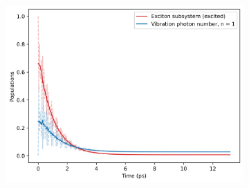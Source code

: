 \documentclass[11pt]{article}
\begin{document}
\begin{figure}[H]
    \vspace{0.5cm}
    
    \begin{subfigure}{0.45\textwidth}
        \centering
        \includegraphics[width=\linewidth]{Research Project/Code/results/ExVib/Open/Population/pops_ex_both_e0.png}
        \caption{}
        \label{fig:EVM_OQS_Pop_both}
    \end{subfigure}
    \hfill

    \caption{}
    \label{fig:EVM_OQS_Pop}
\end{figure}
\end{document}
